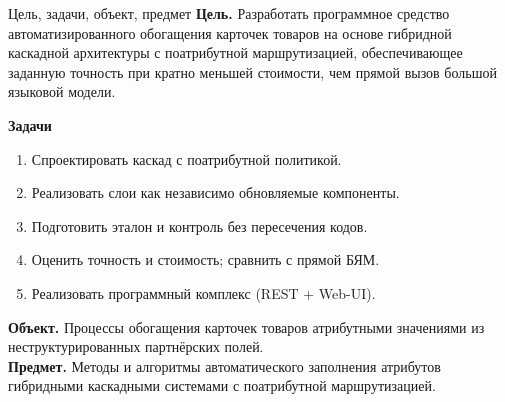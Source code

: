 \documentclass[aspectratio=169, 14pt]{beamer}
\begin{document}
\begin{frame}{Цель, задачи, объект, предмет}
\fontsize{9.5pt}{11.5pt}\selectfont
\textbf{Цель.} Разработать программное средство автоматизированного
обогащения карточек товаров на основе гибридной каскадной архитектуры
с поатрибутной маршрутизацией, обеспечивающее заданную точность
при кратно меньшей стоимости, чем прямой вызов большой языковой модели.

\vspace{0.15em}
\textbf{Задачи}
\begin{enumerate}
    \setlength{\itemsep}{0em}
    \item Спроектировать каскад с поатрибутной политикой.
    \item Реализовать слои как независимо обновляемые компоненты.
    \item Подготовить эталон и контроль без пересечения кодов.
    \item Оценить точность и стоимость; сравнить с прямой БЯМ.
    \item Реализовать программный комплекс (REST + Web-UI).
\end{enumerate}

\vspace{0.15em}
\textbf{Объект.} Процессы обогащения карточек товаров атрибутными значениями
из неструктурированных партнёрских полей.\\
\textbf{Предмет.} Методы и алгоритмы автоматического заполнения атрибутов
гибридными каскадными системами с поатрибутной маршрутизацией.
\end{frame}
\end{document}
